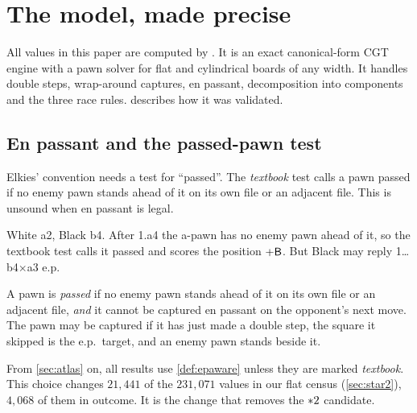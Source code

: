 \section{The model, made precise}\label{sec:model}

All values in this paper are computed by . It is an exact canonical-form CGT engine with a pawn
solver for flat and cylindrical boards of any width. It handles double steps, wrap-around captures, en passant,
decomposition into components and the three race rules.  describes how it was validated.

\subsection{En passant and the passed-pawn test}
Elkies' convention needs a test for ``passed''. The \emph{textbook} test calls a pawn passed if no enemy pawn
stands ahead of it on its own file or an adjacent file. This is unsound when en passant is legal.
\begin{example}\label{ex:ep}
White a2, Black b4. After 1.a4 the a-pawn has no enemy pawn ahead of it, so the textbook test calls it passed
and scores the position $+\mathsf{B}$. But Black may reply 1\dots b4$\times$a3 e.p.
\end{example}
\begin{definition}\label{def:epaware}
A pawn is \emph{passed} if no enemy pawn stands ahead of it on its own file or an adjacent file, \emph{and} it
cannot be captured en passant on the opponent's next move. The pawn may be captured if it has just made a
double step, the square it skipped is the e.p.\ target, and an enemy pawn stands beside it.
\end{definition}
From \cref{sec:atlas} on, all results use \cref{def:epaware} unless they are marked \emph{textbook}. This
choice changes $21{,}441$ of the $231{,}071$ values in our flat census (\cref{sec:star2}), $4{,}068$ of them in
outcome. It is the change that removes the $\mathord{\ast 2}$ candidate.

